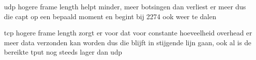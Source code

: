 udp hogere frame length helpt minder, meer botsingen dan verliest er meer dus die capt op een bepaald moment en begint bij 2274 ook weer te dalen

tcp hogere frame length zorgt er voor dat voor constante hoeveelheid overhead er meer data verzonden kan worden dus die blijft in stijgende lijn gaan, ook al is de bereikte tput nog steeds lager dan udp
